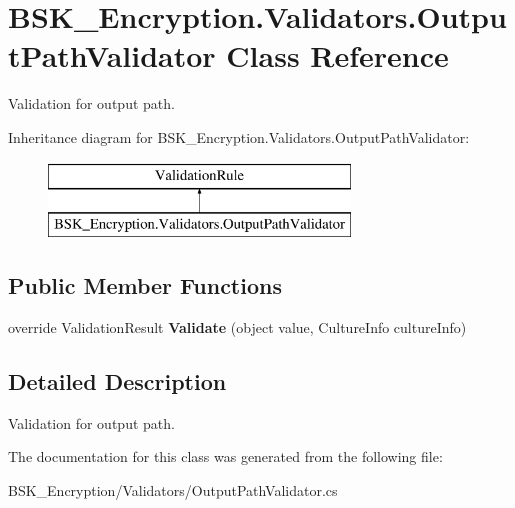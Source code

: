 \hypertarget{class_b_s_k___encryption_1_1_validators_1_1_output_path_validator}{}\section{B\+S\+K\+\_\+\+Encryption.\+Validators.\+Output\+Path\+Validator Class Reference}
\label{class_b_s_k___encryption_1_1_validators_1_1_output_path_validator}


Validation for output path.  


Inheritance diagram for B\+S\+K\+\_\+\+Encryption.\+Validators.\+Output\+Path\+Validator\+:\begin{figure}[H]
\begin{center}
\leavevmode
\includegraphics[height=2.000000cm]{class_b_s_k___encryption_1_1_validators_1_1_output_path_validator}
\end{center}
\end{figure}
\subsection*{Public Member Functions}
\begin{DoxyCompactItemize}
\item 
\mbox{\label{class_b_s_k___encryption_1_1_validators_1_1_output_path_validator_a68ea16176e6d88f8d419d73973085e03}} 
override Validation\+Result {\bfseries Validate} (object value, Culture\+Info culture\+Info)
\end{DoxyCompactItemize}


\subsection{Detailed Description}
Validation for output path. 



The documentation for this class was generated from the following file\+:\begin{DoxyCompactItemize}
\item 
B\+S\+K\+\_\+\+Encryption/\+Validators/Output\+Path\+Validator.\+cs\end{DoxyCompactItemize}
